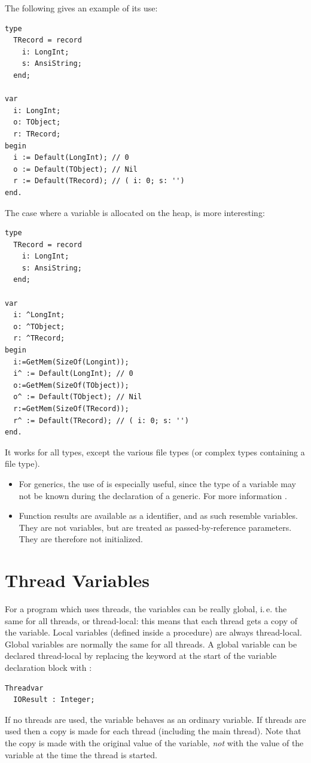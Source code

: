 The following gives an example of its use:
\begin{verbatim}
type
  TRecord = record
    i: LongInt;
    s: AnsiString;
  end;

var
  i: LongInt;
  o: TObject;
  r: TRecord;
begin
  i := Default(LongInt); // 0
  o := Default(TObject); // Nil
  r := Default(TRecord); // ( i: 0; s: '')
end.
\end{verbatim}
The case where a variable is allocated on the heap, is more interesting:
\begin{verbatim}
type
  TRecord = record
    i: LongInt;
    s: AnsiString;
  end;

var
  i: ^LongInt;
  o: ^TObject;
  r: ^TRecord;
begin
  i:=GetMem(SizeOf(Longint));
  i^ := Default(LongInt); // 0
  o:=GetMem(SizeOf(TObject));
  o^ := Default(TObject); // Nil
  r:=GetMem(SizeOf(TRecord));
  r^ := Default(TRecord); // ( i: 0; s: '')
end.
\end{verbatim}
It works for all types, except the various file types (or complex types containing a file type).

\begin{remark}
\begin{itemize}
\item
For generics, the use of  is especially useful, since the type of a variable may not
be known during the declaration of a generic. For more information .
\item
Function results are available as a  identifier, and as such
resemble variables. They are not variables, but are treated as passed-by-reference
parameters. They are therefore not initialized.
\end{itemize}
\end{remark}

\section{Thread Variables}
For a program which uses threads, the variables can be really global, i.\,e. the same for all
threads, or thread-local: this means that each thread gets a copy of the variable.
Local variables (defined inside a procedure) are always thread-local. Global
variables are normally the same for all threads. A global variable can be
declared thread-local by replacing the  keyword at the start of the
variable declaration block with :
\begin{verbatim}
Threadvar
  IOResult : Integer;
\end{verbatim}
If no threads are used, the variable behaves as an ordinary variable.
If threads are used then a copy is made
for each thread (including the main thread). Note that the copy is
made with the original value  of the variable, {\em not} with the
value of the variable at the time the thread is started.

